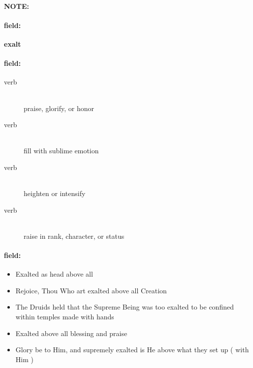 \documentclass[12pt]{article}
\newenvironment{note}{\paragraph{NOTE:}}{}
\newenvironment{field}{\paragraph{field:}}{}
\begin{document}
\begin{note}
\begin{field}
\textbf{\large exalt}
\end{field}


\begin{field}
\begin{description}
\item[verb] \hfill \\ 
praise, glorify, or honor

\item[verb] \hfill \\ 
fill with sublime emotion

\item[verb] \hfill \\ 
heighten or intensify

\item[verb] \hfill \\ 
raise in rank, character, or status

\end{description}
\end{field}

\begin{field}
\begin{itemize}
\item Exalted as head above all
\item Rejoice, Thou Who art exalted above all Creation
\item The Druids held that the Supreme Being was too exalted to be confined within temples made with hands
\item Exalted above all blessing and praise
\item Glory be to Him, and supremely exalted is He above what they set up ( with Him )
\end{itemize}
\end{field}
\end{note}
\end{document}
